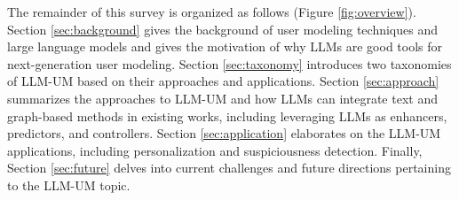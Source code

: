 \documentclass[11pt]{article}
\begin{document}
The remainder of this survey is organized as follows (Figure \ref{fig:overview}). Section \ref{sec:background} gives the background of user modeling techniques and large language models and gives the motivation of why LLMs are good tools for next-generation user modeling. Section \ref{sec:taxonomy} introduces two taxonomies of LLM-UM based on their approaches and applications. Section \ref{sec:approach} summarizes the approaches to LLM-UM and how LLMs can integrate text and graph-based methods in existing works, including leveraging LLMs as enhancers, predictors, and controllers. Section \ref{sec:application} elaborates on the LLM-UM applications, including personalization and suspiciousness detection. Finally, Section \ref{sec:future} delves into current challenges and future directions pertaining to the LLM-UM topic.




\end{document}
